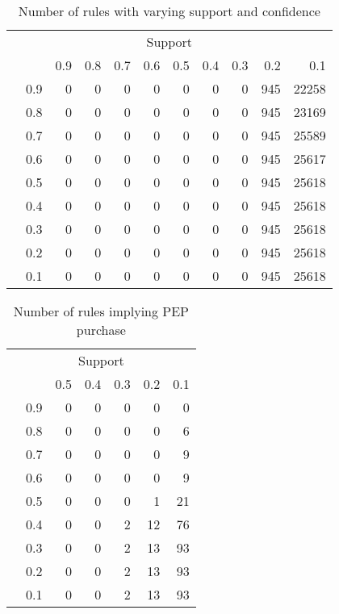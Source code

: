 \documentclass{article}
\begin{document}
\begin{table}
	\centering
	\begin{tabular}{cl|rrrrrrrrr}
	\multicolumn{11}{c}{Support}\\

		&& 0.9 & 0.8 & 0.7 & 0.6 & 0.5 & 0.4 & 0.3 & 0.2 & 0.1\\\cline{2-11}
	\multirow{9}{*}{\STAB{\rotatebox[origin=c]{90}{Confidence}}}
	&0.9 & 0 & 0 & 0 & 0 & 0 & 0 & 0 & 945 & 22258\\\
	&0.8 & 0 & 0 & 0 & 0 & 0 & 0 & 0 & 945 & 23169\\
	&0.7 & 0 & 0 & 0 & 0 & 0 & 0 & 0 & 945 & 25589\\
	&0.6 & 0 & 0 & 0 & 0 & 0 & 0 & 0 & 945 & 25617\\
	&0.5 & 0 & 0 & 0 & 0 & 0 & 0 & 0 & 945 & 25618\\
	&0.4 & 0 & 0 & 0 & 0 & 0 & 0 & 0 & 945 & 25618\\
	&0.3 & 0 & 0 & 0 & 0 & 0 & 0 & 0 & 945 & 25618\\
	&0.2 & 0 & 0 & 0 & 0 & 0 & 0 & 0 & 945 & 25618\\
	&0.1 & 0 & 0 & 0 & 0 & 0 & 0 & 0 & 945 & 25618\\

\end{tabular}
\caption{Number of rules with varying support and confidence}
\end{table}

\begin{table}
	\centering
	\begin{tabular}{cl|rrrrr}
		\multicolumn{7}{c}{Support}\\
		
		&& 0.5 & 0.4 & 0.3 & 0.2 & 0.1\\\cline{2-7}
		\multirow{9}{*}{\STAB{\rotatebox[origin=c]{90}{Confidence}}}
		&0.9 & 0 & 0 & 0 & 0 & 0\\
		&0.8 & 0 & 0 & 0 & 0 & 6\\
		&0.7 & 0 & 0 & 0 & 0 & 9\\
		&0.6 & 0 & 0 & 0 & 0 & 9\\
		&0.5 & 0 & 0 & 0 & 1 & 21\\
		&0.4 & 0 & 0 & 2 & 12 & 76\\
		&0.3 & 0 & 0 & 2 & 13 & 93\\
		&0.2 & 0 & 0 & 2 & 13 & 93\\
		&0.1 & 0 & 0 & 2 & 13 & 93\\
	\end{tabular}
	\caption{Number of rules implying PEP purchase}
\end{table}
\end{document}
